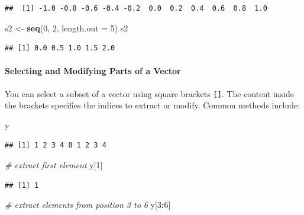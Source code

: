 \documentclass[
]{article}
\newenvironment{Shaded}{\begin{snugshade}}{\end{snugshade}}
\newcommand{\AttributeTok}[1]{\textcolor[rgb]{0.13,0.29,0.53}{#1}}
\newcommand{\CommentTok}[1]{\textcolor[rgb]{0.56,0.35,0.01}{\textit{#1}}}
\newcommand{\DecValTok}[1]{\textcolor[rgb]{0.00,0.00,0.81}{#1}}
\newcommand{\FunctionTok}[1]{\textcolor[rgb]{0.13,0.29,0.53}{\textbf{#1}}}
\newcommand{\NormalTok}[1]{#1}
\newcommand{\OtherTok}[1]{\textcolor[rgb]{0.56,0.35,0.01}{#1}}
\newcommand{\SpecialCharTok}[1]{\textcolor[rgb]{0.81,0.36,0.00}{\textbf{#1}}}
\begin{document}
\begin{verbatim}
##  [1] -1.0 -0.8 -0.6 -0.4 -0.2  0.0  0.2  0.4  0.6  0.8  1.0
\end{verbatim}

\begin{Shaded}
\begin{Highlighting}[]
\NormalTok{s2 }\OtherTok{\textless{}{-}} \FunctionTok{seq}\NormalTok{(}\DecValTok{0}\NormalTok{, }\DecValTok{2}\NormalTok{, }\AttributeTok{length.out =} \DecValTok{5}\NormalTok{)}
\NormalTok{s2}
\end{Highlighting}
\end{Shaded}

\begin{verbatim}
## [1] 0.0 0.5 1.0 1.5 2.0
\end{verbatim}

\hypertarget{selecting-and-modifying-parts-of-a-vector}{%
\paragraph{Selecting and Modifying Parts of a
Vector}\label{selecting-and-modifying-parts-of-a-vector}}

You can select a subset of a vector using square brackets
\texttt{{[}{]}}. The content inside the brackets specifies the indices
to extract or modify. Common methods include:

\begin{Shaded}
\begin{Highlighting}[]
\NormalTok{y}
\end{Highlighting}
\end{Shaded}

\begin{verbatim}
## [1] 1 2 3 4 0 1 2 3 4
\end{verbatim}

\begin{Shaded}
\begin{Highlighting}[]
\CommentTok{\# extract first element}
\NormalTok{y[}\DecValTok{1}\NormalTok{]}
\end{Highlighting}
\end{Shaded}

\begin{verbatim}
## [1] 1
\end{verbatim}

\begin{Shaded}
\begin{Highlighting}[]
\CommentTok{\# extract elements from position 3 to 6}
\NormalTok{y[}\DecValTok{3}\SpecialCharTok{:}\DecValTok{6}\NormalTok{]}
\end{Highlighting}
\end{Shaded}
\end{document}
